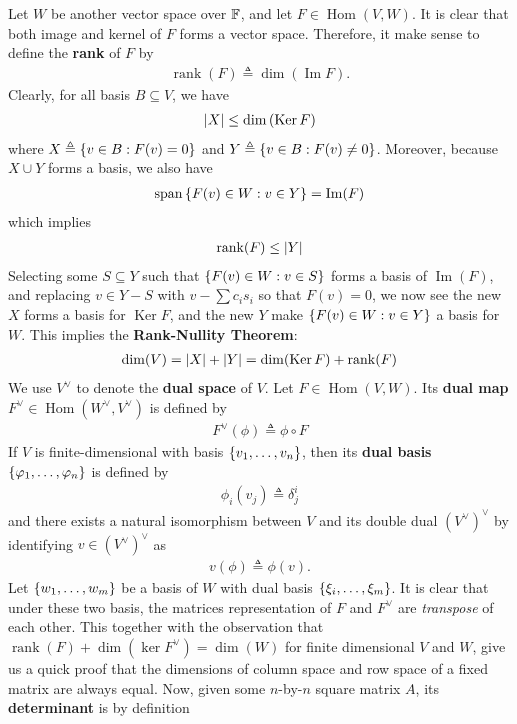 \documentclass{report}
\begin{document}
Let $W$ be another vector space over  $\mathbb{F}$, and let $F \in \operatorname{Hom}(V,W)$. It is clear that  both image and kernel of $F$ forms a vector space. Therefore, it make sense to define the \textbf{rank} of $F$ by 
 \begin{align*}
\operatorname{rank}(F)\triangleq \operatorname{dim} (\operatorname{Im}F). 
\end{align*}
Clearly, for all basis $B \subseteq V$, we have
\begin{align*}
\left|X\right|\leq \operatorname{dim}\left(\operatorname{Ker}F \right)
\end{align*}
where $X\triangleq \left\{ v \in B: F(v)=0 \right\}$ and $Y\triangleq \left\{ v \in B:F(v)\neq 0 \right\}$. Moreover, because $X \cup  Y$ forms a basis, we also have     
\begin{align*}
\operatorname{span}\left\{ F(v) \in W: v \in Y \right\}=\operatorname{Im}(F)
\end{align*}
which implies 
\begin{align*}
  \operatorname{rank}(F)\leq \left|Y\right|
\end{align*}
Selecting some $S\subseteq Y$ such that $\left\{ F(v)\in W: v \in S \right\}$ forms a basis of $\operatorname{Im}(F)$, and replacing $v \in Y-S$ with $v- \sum c_i s_i$ so that $F(v)=0$, we now see the new $X$ forms a basis for  $\operatorname{Ker}F$, and the new $Y$ make  $\left\{ F(v)\in W: v \in Y \right\}$ a basis for $W$. This implies the  \textbf{Rank-Nullity Theorem}: 
\begin{align*}
\operatorname{dim}(V)=\left|X\right|+ \left|Y\right|= \operatorname{dim}(\operatorname{Ker}F)+ \operatorname{rank}(F)
\end{align*}
We use $V^\vee$ to denote the \textbf{dual space} of $V$. Let $F\in \operatorname{Hom}(V,W)$. Its \textbf{dual map} $F^\vee\in  \operatorname{Hom}(W^{\vee},V^{\vee})$ is defined by 
\begin{align*}
F^\vee (\phi)\triangleq \phi \circ F
\end{align*}
If $V$ is finite-dimensional with basis  $\left\{ v_1,\dots ,v_n \right\}$, then its \textbf{dual basis} $\left\{ \varphi_1,\dots ,\varphi_n \right\}$ is defined by 
\begin{align*}
\phi_i (v_j)\triangleq \delta^i_j
\end{align*}
and there exists a natural isomorphism between $V$ and its double dual  $(V^\vee)^\vee$ by identifying $v\in (V^\vee)^\vee$ as 
\begin{align*}
v(\phi) \triangleq \phi (v). 
\end{align*}
Let $\left\{ w_1,\dots ,w_m \right\}$ be a basis of $W$ with dual basis  $\left\{ \xi_i , \dots ,\xi_m \right\}$. It is clear that under these two basis, the matrices representation of $F$ and  $F^\vee$ are \emph{transpose} of each other. This together with the observation that $\operatorname{rank}(F)+ \operatorname{dim}(\operatorname{ker}F^\vee)= \operatorname{dim}(W)$ for finite dimensional $V$ and  $W$, give us a quick proof that the dimensions of column space and row space of a fixed matrix are always equal. Now, given some $n$-by-$n$ square matrix $A$, its \textbf{determinant} is by definition 
\end{document}
